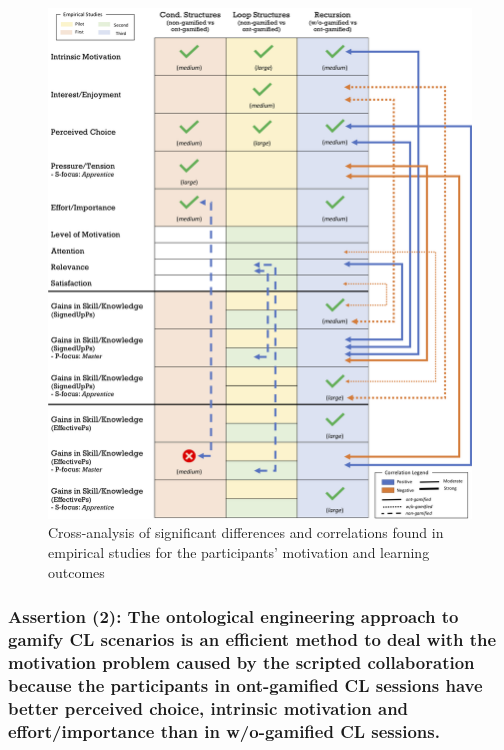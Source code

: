 \begin{figure}[htb]
 \caption{Cross-analysis of significant differences and correlations found in empirical studies for the participants' motivation and learning outcomes}
 \label{fig:cross-analysis}
 \centering
 \includegraphics[width=1\textwidth]{images/chap-evaluation/cross-analysis.png}
 \fautor
\end{figure}

\subsubsection*{Assertion (2): The ontological engineering approach to gamify CL scenarios is an efficient method to deal with the motivation problem caused by the scripted collaboration because the participants in ont-gamified CL sessions have better perceived choice, intrinsic motivation and effort/importance than in w/o-gamified CL sessions.}

